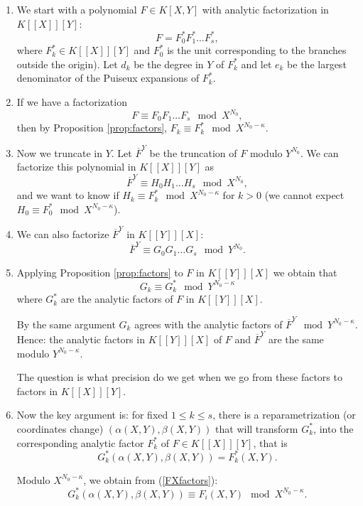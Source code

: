 \documentclass[a4paper,11pt,reqno]{amsart}%
\theoremstyle{definition}
\theoremstyle{plain}
\theoremstyle{remark}
\begin{document}
\begin{enumerate}
\item We start with a polynomial $F \in K[X,Y]$ with analytic factorization in $K[[X]][Y]$:
$$
F = F_0^* F_1^* \dots F_s^*,$$
where $F_k^* \in K[[X]][Y]$ and $F_0^*$ is the unit corresponding to the branches outside the origin). Let $d_k$ be the degree in $Y$ of $F_k^*$ and let $e_k$ be the largest denominator of the Puiseux expansions of $F_k^*$.

\item If we have a factorization
\begin{equation} \label{FXfactors}
F \equiv  F_0 F_1 \dots F_s \mod X^{N_0},
\end{equation}
then by Proposition \ref{prop:factors}, $F_k \equiv F_k^* \mod X^{N_0 - \kappa}$.


\item Now we truncate in $Y$. Let $\overline{F}^{Y}$ be the truncation of $F$ modulo $Y^{N_0}$. We can factorize this polynomial in $K[[X]][Y]$ as
$$
\overline{F}^{Y} \equiv  {H}_0 {H}_1 \dots {H}_s \mod X^{N_0},
$$
and we want to know if ${H}_k \equiv F^*_k \mod X^{N_0 - \kappa}$ for $k > 0$ (we cannot expect $H_0 \equiv F_0^* \mod X^{N_0 - \kappa}$).

\item We can also factorize $\overline{F}^{Y}$ in $K[[Y]][X]$:
$$\overline{F}^{Y} \equiv G_0 G_1 \dots G_s \mod Y^{N_0}.$$

\item Applying Proposition \ref{prop:factors} to ${F}$ in $K[[Y]][X]$  we obtain that
$$G_k \equiv G_k^* \mod Y^{N_0 - \kappa}$$
where $G_k^*$ are the analytic factors of $F$ in $K[[Y]][X]$.

By the same argument $G_k$ agrees with the analytic factors of $\overline{F}^{Y} \mod Y^{N_0 - \kappa}$.
Hence: the analytic factors in $K[[Y]][X]$ of $F$ and $\overline{F}^{Y}$ are the same modulo $Y^{N_0 - \kappa}$.

The question is what precision do we get when we go from these factors to factors in $K[[X]][Y]$.

\item Now the key argument is: for fixed $1 \le k \le s$, there is a reparametrization (or coordinates change) $(\alpha(X,Y), \beta(X,Y))$ that will transform $G_k^*$, into the corresponding analytic factor $F_k^*$ of $F \in K[[X]][Y]$, that is
$$
G_k^*(\alpha(X,Y), \beta(X,Y)) = F_k^*(X,Y).
$$

Modulo $X^{N_0-\kappa}$, we obtain from (\ref{FXfactors}):
$$
G_k^*(\alpha(X,Y), \beta(X,Y)) \equiv F_i(X,Y) \mod X^{N_0-\kappa}.
$$


\end{enumerate}
\end{document}
